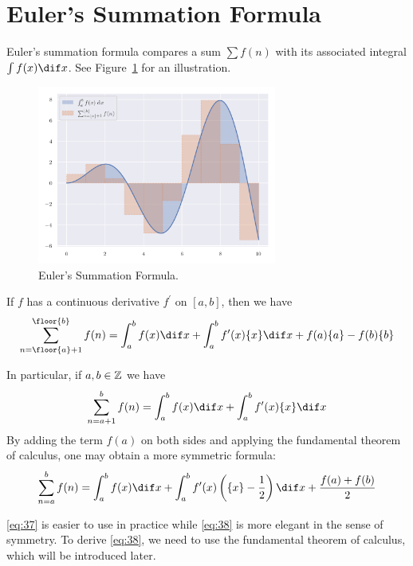 \documentclass[thmcnt=section, color=blue, 12pt]{my-elegantbook}
\begin{document}
\section{Euler's Summation Formula}


Euler's summation formula compares a sum $\sum f(n)$
with its associated integral $\int f(x) \dif x$.
See Figure~\ref{fig:6} for an illustration.

\begin{figure}[H]
	\centering
	\includegraphics[width=0.7\textwidth]{figures/euler-summation-formula.png}
	\caption{Euler's Summation Formula.}
	\label{fig:6}
\end{figure}

\begin{theorem}
	If $f$ has a continuous derivative $f^\prime$ on $[a, b]$,
	then we have
	\begin{align}
		\sum_{n=\floor{a}+1}^{\floor{b}} f(n)
		= \int_a^b f(x) \dif x
		+ \int_a^b f^\prime(x) \{x\} \dif x
		+ f(a) \{a\} - f(b) \{b\}
		\label{eq:33}
	\end{align}

	In particular, if $a, b \in \mathbb{Z}$ we have
	\begin{align}
		\sum_{n=a+1}^{b} f(n)
		= \int_a^b f(x) \dif x
		+ \int_a^b f^\prime(x) \{x\} \dif x
		\label{eq:37}
	\end{align}
	By adding the term $f(a)$ on both sides and applying
	the fundamental theorem of calculus,
	one may obtain a more symmetric formula:
	\begin{align}
		\sum_{n=a}^b f(n)
		= \int_a^b f(x) \dif x
		+ \int_a^b f^\prime(x) \left( \{x\} - \frac{1}{2} \right) \dif x
		+ \frac{f(a) + f(b)}{2}
		\label{eq:38}
	\end{align}
\end{theorem}

\begin{note}
	\eqref{eq:37} is easier to use in practice while \eqref{eq:38}
	is more elegant in the sense of symmetry.
	To derive \eqref{eq:38}, we need to use the fundamental theorem of calculus,
	which will be introduced later.
\end{note}
\end{document}
